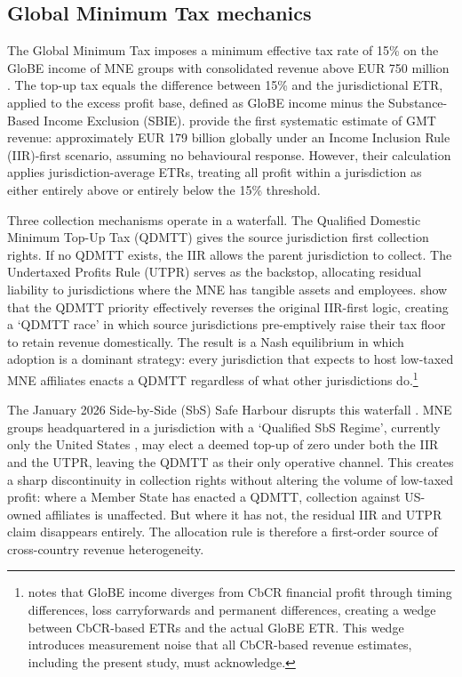 \documentclass[11pt,a4paper]{article}
\begin{document}
\subsection{Global Minimum Tax mechanics}\label{sec:design}

The Global Minimum Tax imposes a minimum effective tax rate of 15\% on the GloBE income of MNE groups with consolidated revenue above EUR 750 million \citep{oecd2025}. The top-up tax equals the difference between 15\% and the jurisdictional ETR, applied to the excess profit base, defined as GloBE income minus the Substance-Based Income Exclusion (SBIE). \citet{barake2022} provide the first systematic estimate of GMT revenue: approximately EUR 179 billion globally under an Income Inclusion Rule (IIR)-first scenario, assuming no behavioural response. However, their calculation applies jurisdiction-average ETRs, treating all profit within a jurisdiction as either entirely above or entirely below the 15\% threshold.

Three collection mechanisms operate in a waterfall. The Qualified Domestic Minimum Top-Up Tax (QDMTT) gives the source jurisdiction first collection rights. If no QDMTT exists, the IIR allows the parent jurisdiction to collect. The Undertaxed Profits Rule (UTPR) serves as the backstop, allocating residual liability to jurisdictions where the MNE has tangible assets and employees. \citet{devereux2022} show that the QDMTT priority effectively reverses the original IIR-first logic, creating a `QDMTT race' in which source jurisdictions pre-emptively raise their tax floor to retain revenue domestically. The result is a Nash equilibrium in which adoption is a dominant strategy: every jurisdiction that expects to host low-taxed MNE affiliates enacts a QDMTT regardless of what other jurisdictions do.\footnote{\citet{hanlon2023} notes that GloBE income diverges from CbCR financial profit through timing differences, loss carryforwards and permanent differences, creating a wedge between CbCR-based ETRs and the actual GloBE ETR. This wedge introduces measurement noise that all CbCR-based revenue estimates, including the present study, must acknowledge.}

The January 2026 Side-by-Side (SbS) Safe Harbour disrupts this waterfall \citep{oecd2026}. MNE groups headquartered in a jurisdiction with a `Qualified SbS Regime', currently only the United States \citep{oecdCentralRecord2026}, may elect a deemed top-up of zero under both the IIR and the UTPR, leaving the QDMTT as their only operative channel. This creates a sharp discontinuity in collection rights without altering the volume of low-taxed profit: where a Member State has enacted a QDMTT, collection against US-owned affiliates is unaffected. But where it has not, the residual IIR and UTPR claim disappears entirely. The allocation rule is therefore a first-order source of cross-country revenue heterogeneity.
\end{document}
